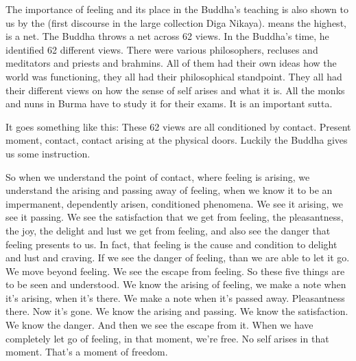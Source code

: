 \documentclass[letterpaper,10pt,english]{sphinxmanual}
\begin{document}
\sphinxAtStartPar
The importance of feeling and its place in the Buddha’s teaching is also
shown to us by the
(first discourse in the large collection
Diga Nikaya).
means the highest,
is a net. The Buddha throws
a net across 62 views. In the Buddha’s time, he identified 62 different views.
There  were  various  philosophers,  recluses  and  meditators  and  priests  and
brahmins. All of them had their own ideas how the world was functioning,
they all had their philosophical standpoint. They all had their different views
on  how  the  sense  of  self  arises  and  what  it  is. All  the  monks  and  nuns  in
Burma have to study it for their exams. It is an important sutta.

\sphinxAtStartPar
It goes something like this:
These 62 views are all conditioned by contact. Present moment,
contact,  contact  arising  at  the  physical  doors.
Luckily  the  Buddha  gives  us  some  instruction.

\sphinxAtStartPar
So when we understand the point of contact, where feeling is arising,
we understand the arising and passing away of feeling, when we know it to
be an impermanent, dependently arisen, conditioned phenomena. We see it
arising, we see it passing. We see the satisfaction that we get from feeling,
the pleasantness, the joy, the delight and lust we get from feeling, and also
see the danger that feeling presents to us. In fact, that feeling is the cause
and condition to delight and lust and craving. If we see the danger of feeling,
than we are able to let it go. We move beyond feeling. We see the escape
from feeling. So these five things are to be seen and understood. We know
the  arising  of  feeling,  we  make  a  note  when  it’s  arising,  when  it’s  there.
We make a note when it’s passed away. Pleasantness there. Now it’s gone.
We know the arising and passing. We know the satisfaction. We know the
danger. And then we see the escape from it. When we have completely let go
of feeling, in that moment, we’re free. No self arises in that moment. That’s
a moment of freedom.
\end{document}
